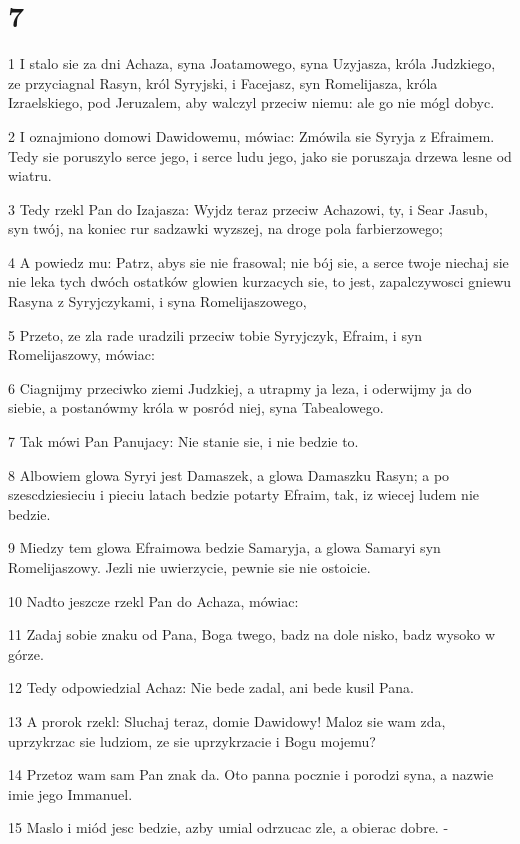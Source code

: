 \chapter{7}

\par 1 I stalo sie za dni Achaza, syna Joatamowego, syna Uzyjasza, króla Judzkiego, ze przyciagnal Rasyn, król Syryjski, i Facejasz, syn Romelijasza, króla Izraelskiego, pod Jeruzalem, aby walczyl przeciw niemu: ale go nie mógl dobyc.
\par 2 I oznajmiono domowi Dawidowemu, mówiac: Zmówila sie Syryja z Efraimem. Tedy sie poruszylo serce jego, i serce ludu jego, jako sie poruszaja drzewa lesne od wiatru.
\par 3 Tedy rzekl Pan do Izajasza: Wyjdz teraz przeciw Achazowi, ty, i Sear Jasub, syn twój, na koniec rur sadzawki wyzszej, na droge pola farbierzowego;
\par 4 A powiedz mu: Patrz, abys sie nie frasowal; nie bój sie, a serce twoje niechaj sie nie leka tych dwóch ostatków glowien kurzacych sie, to jest, zapalczywosci gniewu Rasyna z Syryjczykami, i syna Romelijaszowego,
\par 5 Przeto, ze zla rade uradzili przeciw tobie Syryjczyk, Efraim, i syn Romelijaszowy, mówiac:
\par 6 Ciagnijmy przeciwko ziemi Judzkiej, a utrapmy ja leza, i oderwijmy ja do siebie, a postanówmy króla w posród niej, syna Tabealowego.
\par 7 Tak mówi Pan Panujacy: Nie stanie sie, i nie bedzie to.
\par 8 Albowiem glowa Syryi jest Damaszek, a glowa Damaszku Rasyn; a po szescdziesieciu i pieciu latach bedzie potarty Efraim, tak, iz wiecej ludem nie bedzie.
\par 9 Miedzy tem glowa Efraimowa bedzie Samaryja, a glowa Samaryi syn Romelijaszowy. Jezli nie uwierzycie, pewnie sie nie ostoicie.
\par 10 Nadto jeszcze rzekl Pan do Achaza, mówiac:
\par 11 Zadaj sobie znaku od Pana, Boga twego, badz na dole nisko, badz wysoko w górze.
\par 12 Tedy odpowiedzial Achaz: Nie bede zadal, ani bede kusil Pana.
\par 13 A prorok rzekl: Sluchaj teraz, domie Dawidowy! Maloz sie wam zda, uprzykrzac sie ludziom, ze sie uprzykrzacie i Bogu mojemu?
\par 14 Przetoz wam sam Pan znak da. Oto panna pocznie i porodzi syna, a nazwie imie jego Immanuel.
\par 15 Maslo i miód jesc bedzie, azby umial odrzucac zle, a obierac dobre. -
